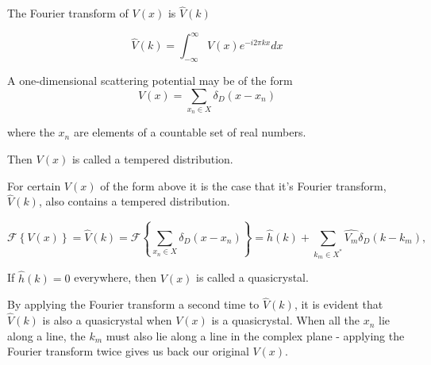 \documentclass[11pt, oneside]{article}   	%
\begin{document}
The Fourier transform of $V(x)$ is $\hat{V}(k)$ 

\begin{equation}
\hat{V}(k) = \int_{-\infty}^{\infty}V(x)e^{-i2\pi kx}dx
\end{equation}

A one-dimensional scattering potential may be of the form 
\begin{equation}
V(x) = \sum_{x_n \in X}\delta_D(x - x_n)
\end{equation} 
 
where the $x_n$ are elements of a countable set of real numbers.
 
Then $V(x)$ is called a tempered distribution.

 For certain $V(x)$ of the form above it is the case that it's Fourier transform, $\hat{V}(k)$, also contains a tempered distribution. 
  
\begin{equation}
 \label{eq: RiemannFourier}
 \mathcal{F}\left \{V(x)\right \} = \hat{V}(k) = \mathcal{F}\left \{ \sum_{x_n \in X}\delta_D(x - x_n) \right \} = \hat{h}(k) +  \sum_{k_m \in X^{*}} \hat{V_{m}} \delta_D(k - k_{m}),
\end{equation}

If $\hat{h}(k) = 0$ everywhere, then $V(x)$ is called a quasicrystal.

By applying the Fourier transform a second time to $\hat{V}(k)$, it is evident that $\hat{V}(k)$ is also a quasicrystal when $V(x)$ is a quasicrystal. When all the $x_n$ lie along a line, the $k_m$ must also lie along a line in the complex plane - applying the Fourier transform twice gives us back our original $V(x)$.









\end{document}
